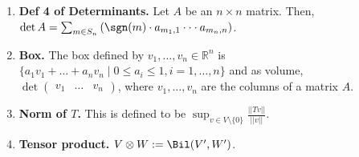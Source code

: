 \begin{enumerate}
	\item \textbf{Def 4 of Determinants. } Let $A$ be an $n \times n$ matrix. Then, $\det A = \sum_{m \in S_n} \left(\sgn(m) \cdot a_{m_1,1} \cdot \cdot \cdot a_{m_n,n}\right)$. 
	\item \textbf{Box. } The box defined by $v_1,\dots,v_n \in \mathbb{R}^n$ is $\{a_1v_1 + \dots + a_nv_n \mid 0 \leq a_i \leq 1, i =1,\dots,n\}$ and as volume, $\det \begin{pmatrix} v_1 & \dots & v_n \end{pmatrix}$, where $v_1,\dots,v_n$ are the columns of a matrix $A$. 
	\item \textbf{Norm of $T$. } This is defined to be $\sup_{v \in V \setminus \{0\}} \frac{||Tv||}{||v||}$. 
	\item \textbf{Tensor product. } $V \otimes W := \Bil(V',W')$. 
\end{enumerate}


